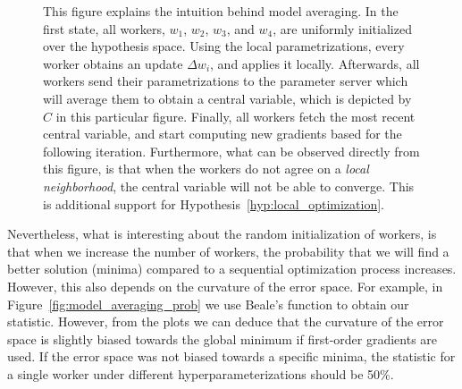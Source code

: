 \begin{figure}[H]
  \caption{This figure explains the intuition behind model averaging. In the first state, all workers, $w_1$, $w_2$, $w_3$, and $w_4$, are uniformly initialized over the hypothesis space. Using the local parametrizations, every worker obtains an update $\Delta w_i$, and applies it locally. Afterwards, all workers send their parametrizations to the parameter server which will average them to obtain a central variable, which is depicted by $C$ in this particular figure. Finally, all workers fetch the most recent central variable, and start computing new gradients based for the following iteration.  Furthermore, what can be observed directly from this figure, is that when the workers do not agree on a \emph{local neighborhood}, the central variable will not be able to converge. This is additional support for Hypothesis~\ref{hyp:local_optimization}.}
  \label{fig:model_averaging_intuition}
\end{figure}

Nevertheless, what is interesting about the random initialization of workers, is that when we increase the number of workers, the probability that we will find a better solution (minima) compared to a sequential optimization process increases. However, this also depends on the curvature of the error space. For example, in Figure~\ref{fig:model_averaging_prob} we use Beale's function to obtain our statistic. However, from the plots we can deduce that the curvature of the error space is slightly biased towards the global minimum if first-order gradients are used. If the error space was not biased towards a specific minima, the statistic for a single worker under different hyperparameterizations should be 50\%.\\

